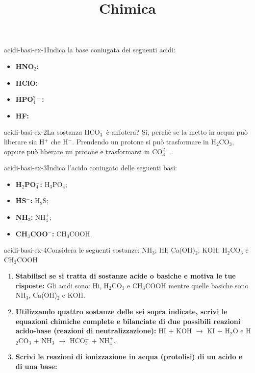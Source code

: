 \documentclass[preview]{standalone}
\begin{document}
\title{Chimica}
\genpage

\begin{snippetexercise}{acidi-basi-ex-1}{Indica la base coniugata dei seguenti acidi:}
    \begin{itemize}
        \item \textbf{HNO\(_2\):}
        \item \textbf{HClO:}
        \item \textbf{HPO\(_4^{2-}\):}
        \item \textbf{HF:}
    \end{itemize}
\end{snippetexercise}

\begin{snippetexercise}{acidi-basi-ex-2}{La sostanza HCO\(_3^-\) è anfotera?}
    Sì, perché se la metto in acqua può liberare sia H\({}^+\) che H\({}^-\).
    Prendendo un protone si può trasformare in H\({}_2\)CO\({}_3\),
    oppure può liberare un protone e trasformarsi in CO\({}_3^{2-}\).
\end{snippetexercise}


\begin{snippetexercise}{acidi-basi-ex-3}{Indica l'acido coniugato delle seguenti basi:}
    \begin{itemize}
        \item \textbf{H\({}_2\)PO\({}_4^-\):} H\(_3\)PO\(_4\);
        \item \textbf{HS\({}^-\):} H\(_2\)S;
        \item \textbf{NH\({}_3\):} NH\(_4^+\);
        \item \textbf{CH\({}_3\)COO\({}^-\):} CH\(_3\)COOH.
    \end{itemize}
\end{snippetexercise}

\begin{snippetexercise}{acidi-basi-ex-4}{Considera le seguenti sostanze:
    NH\(_3\); HI; Ca(OH)\({}_2\); KOH; H\({}_2\)CO\({}_3\) e CH\({}_3\)COOH}
    \begin{enumerate}
        \item \textbf{Stabilisci se si tratta di sostanze acide o basiche e motiva le tue risposte:}
            Gli acidi sono: Hi, H\({}_2\)CO\({}_3\) e CH\({}_3\)COOH
            mentre quelle basiche sono NH\(_3\), Ca(OH)\({}_2\) e KOH.
        \item \textbf{Utilizzando quattro sostanze delle sei sopra indicate, scrivi le equazioni chimiche
        complete e bilanciate di due possibili reazioni acido-base (reazioni di
        neutralizzazione):}
        HI + KOH \(\rightarrow\) KI + H\({}_2\)O
        e
        H\({}_2\)CO\({}_3\) + NH\({}_3\) \(\rightarrow\) HCO\({}_3^-\) + NH\({}_4^+\).
        \item \textbf{Scrivi le reazioni di ionizzazione in acqua (protolisi) di un acido e di una base:}

    \end{enumerate}
\end{snippetexercise}
\end{document}
